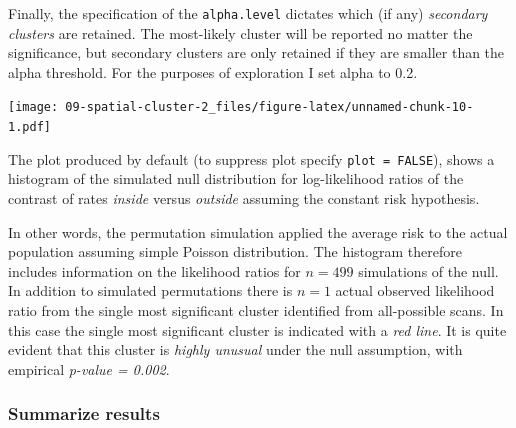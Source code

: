 \documentclass[
]{book}
\newenvironment{Shaded}{\begin{snugshade}}{\end{snugshade}}
\newcommand{\AttributeTok}[1]{\textcolor[rgb]{0.13,0.29,0.53}{#1}}
\newcommand{\DecValTok}[1]{\textcolor[rgb]{0.00,0.00,0.81}{#1}}
\newcommand{\FloatTok}[1]{\textcolor[rgb]{0.00,0.00,0.81}{#1}}
\newcommand{\FunctionTok}[1]{\textcolor[rgb]{0.13,0.29,0.53}{\textbf{#1}}}
\newcommand{\NormalTok}[1]{#1}
\newcommand{\OtherTok}[1]{\textcolor[rgb]{0.56,0.35,0.01}{#1}}
\newcommand{\SpecialCharTok}[1]{\textcolor[rgb]{0.81,0.36,0.00}{\textbf{#1}}}
\begin{document}
Finally, the specification of the \texttt{alpha.level} dictates which (if any) \emph{secondary clusters} are retained. The most-likely cluster will be reported no matter the significance, but secondary clusters are only retained if they are smaller than the alpha threshold. For the purposes of exploration I set alpha to 0.2.

\begin{Shaded}
\end{Shaded}

\texttt{[image: 09-spatial-cluster-2\_files/figure-latex/unnamed-chunk-10-1.pdf]}

The plot produced by default (to suppress plot specify \texttt{plot\ =\ FALSE}), shows a histogram of the simulated null distribution for log-likelihood ratios of the contrast of rates \emph{inside} versus \emph{outside} assuming the constant risk hypothesis.

In other words, the permutation simulation applied the average risk to the actual population assuming simple Poisson distribution. The histogram therefore includes information on the likelihood ratios for \(n=499\) simulations of the null. In addition to simulated permutations there is \(n=1\) actual observed likelihood ratio from the single most significant cluster identified from all-possible scans. In this case the single most significant cluster is indicated with a \emph{red line}. It is quite evident that this cluster is \emph{highly unusual} under the null assumption, with empirical \emph{p-value = 0.002}.

\hypertarget{summarize-results}{%
\subsubsection{Summarize results}\label{summarize-results}}
\end{document}
